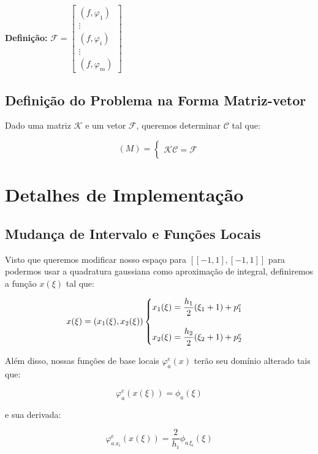   \textbf{Definição:} $\displaystyle \mathcal{F} = \begin{bmatrix}
    (f, \varphi_1) \\ \vdots \\ (f, \varphi_i) \\ \vdots \\ (f, \varphi_m)
  \end{bmatrix}$

\section{Definição do Problema na Forma Matriz-vetor}

  Dado uma matriz $\mathcal{K}$ e um vetor $\mathcal{F}$, queremos determinar $\mathcal{C}$ tal que:

  \[(M) = \begin{cases} \\
    \mathcal{K} \mathcal{C} = \mathcal{F} \\
  \end{cases}\]

\chapter{Detalhes de Implementação}

\section{Mudança de Intervalo e Funções Locais}

  Visto que queremos modificar nosso espaço para $[[-1, 1], [-1, 1]]$ para podermos usar a quadratura gaussiana como aproximação de integral, definiremos a função $x(\xi)$ tal que:

  \[x(\xi) = (x_1(\xi), x_2(\xi)) \begin{cases}
    x_1(\xi) = \dfrac{h_1}{2}(\xi_1 + 1) + p^e_1 \\
    \vphantom{}\\
    x_2(\xi) = \dfrac{h_2}{2}(\xi_2 + 1) + p^e_2 \\
  \end{cases}\]

  Além disso, nossas funções de base locais $\varphi_a^e(x)$ terão seu domínio alterado tais que:

  \[\varphi_a^e(x(\xi)) = \phi_a(\xi)\]

  e sua derivada:

  \[\varphi_{a\,x_i}^e(x(\xi)) = \dfrac{2}{h_i}\phi_{a\,\xi_i}(\xi)\]

